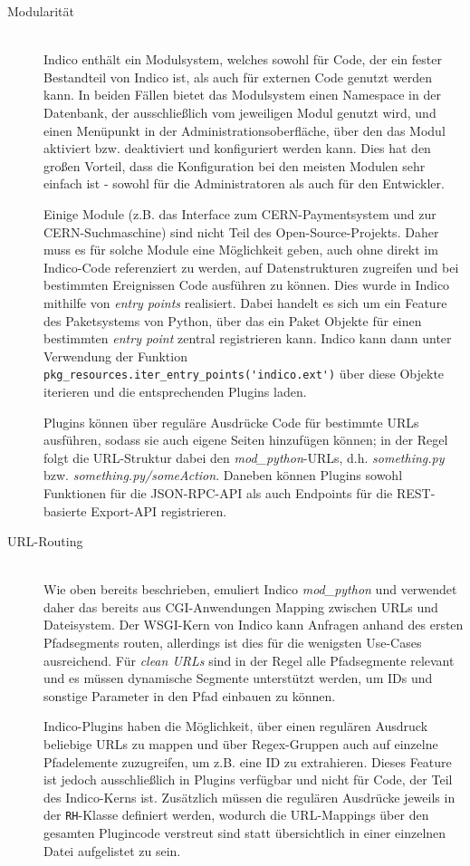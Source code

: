 \begin{description}
\item[Modularität] \hfill \\
Indico enthält ein Modulsystem, welches sowohl für Code, der ein fester Bestandteil von Indico ist,
als auch für externen Code genutzt werden kann. In beiden Fällen bietet das Modulsystem einen
Namespace in der Datenbank, der ausschließlich vom jeweiligen Modul genutzt wird, und einen
Menüpunkt in der Administrationsoberfläche, über den das Modul aktiviert bzw. deaktiviert und
konfiguriert werden kann. Dies hat den großen Vorteil, dass die Konfiguration bei den meisten
Modulen sehr einfach ist - sowohl für die Administratoren als auch für den Entwickler.

Einige Module (z.B. das Interface zum CERN-Paymentsystem und zur CERN-Suchmaschine) sind
nicht Teil des Open-Source-Projekts. Daher muss es für solche Module eine Möglichkeit geben, auch
ohne direkt im Indico-Code referenziert zu werden, auf Datenstrukturen zugreifen und bei bestimmten
Ereignissen Code ausführen zu können. Dies wurde in Indico mithilfe von \emph{entry points}
realisiert. Dabei handelt es sich um ein Feature des Paketsystems von Python, über das ein Paket
Objekte für einen bestimmten \emph{entry point} zentral registrieren kann. Indico kann dann unter
Verwendung der Funktion \lstinline{pkg_resources.iter_entry_points('indico.ext')} über diese Objekte
iterieren und die entsprechenden Plugins laden.

Plugins können über reguläre Ausdrücke Code für bestimmte URLs ausführen, sodass sie auch eigene
Seiten hinzufügen können; in der Regel folgt die URL-Struktur dabei den \emph{mod\_python}-URLs,
d.h. \emph{something.py} bzw. \emph{something.py/someAction}. Daneben können Plugins sowohl
Funktionen für die JSON-RPC-API als auch Endpoints für die REST-basierte Export-API registrieren.


\item[URL-Routing] \hfill \\
Wie oben bereits beschrieben, emuliert Indico \emph{mod\_python} und
verwendet daher das bereits aus CGI-Anwendungen Mapping zwischen URLs und Dateisystem. Der WSGI-Kern
von Indico kann Anfragen anhand des ersten Pfadsegments routen, allerdings ist dies für die
wenigsten Use-Cases ausreichend. Für \emph{clean URLs} sind in der Regel alle Pfadsegmente relevant
und es müssen dynamische Segmente unterstützt werden, um IDs und sonstige Parameter in den Pfad
einbauen zu können.

Indico-Plugins haben die Möglichkeit, über einen regulären Ausdruck beliebige URLs zu mappen und
über Regex-Gruppen auch auf einzelne Pfadelemente zuzugreifen, um z.B. eine ID zu
extrahieren. Dieses Feature ist jedoch ausschließlich in Plugins verfügbar und nicht für Code,
der Teil des Indico-Kerns ist. Zusätzlich müssen die regulären Ausdrücke jeweils in der
\lstinline{RH}-Klasse definiert werden, wodurch die URL-Mappings über den gesamten Plugincode
verstreut sind statt übersichtlich in einer einzelnen Datei aufgelistet zu sein.


\end{description}
